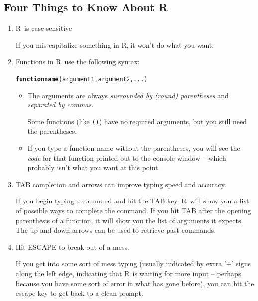 \documentclass[twoside]{book}\usepackage[]{graphicx}\usepackage[]{xcolor}
\makeatletter
\newcommand{\hlstd}[1]{\textcolor[rgb]{0.345,0.345,0.345}{#1}}%
\newcommand{\hlkwd}[1]{\textcolor[rgb]{0.737,0.353,0.396}{\textbf{#1}}}%
\newenvironment{kframe}{%
 \def\at@end@of@kframe{}%
 \ifinner\ifhmode%
  \def\at@end@of@kframe{\end{minipage}}%
  \begin{minipage}{\columnwidth}%
 \fi\fi%
 \def\FrameCommand##1{\hskip\@totalleftmargin \hskip-\fboxsep
 \colorbox{shadecolor}{##1}\hskip-\fboxsep
     \hskip-\linewidth \hskip-\@totalleftmargin \hskip\columnwidth}%
 \MakeFramed {\advance\hsize-\width
   \@totalleftmargin\z@ \linewidth\hsize
   \@setminipage}}%
 {\par\unskip\endMakeFramed%
 \at@end@of@kframe}
\newenvironment{knitrout}{}{} %
\newcommand{\Rindex}[1]{\index{\texttt{#1}}}
\newcommand{\function}[1]{{\color{purple!75!blue}\texttt{\StrSubstitute{#1}{()}{}()}}\Rindex{#1}}
\def\R{{\sf R}}
\makeatother
\begin{document}
\subsection{Four Things to Know About \R}
\begin{enumerate}
\item \R\ is case-sensitive

If you mis-capitalize something in \R, it won't do what you want.

\item 
Functions in \R\ use the following syntax:
\begin{knitrout}
\color{fgcolor}\begin{kframe}
\begin{alltt}
\hlkwd{functionname}\hlstd{( argument1, argument2, ... )}
\end{alltt}
\end{kframe}
\end{knitrout}
\vspace{-5mm}
\begin{itemize}
\item The arguments are \underline{always} \emph{surrounded by (round) parentheses} and 
\emph{separated by commas}.

Some functions (like \function{data()}) 
have no required arguments, but you still need the parentheses.

\item
If you type a function name without the parentheses, you will see the \emph{code} for that
function printed out to the console window -- which probably isn't what you want at this point.
\end{itemize}
\item
TAB completion and arrows can improve typing speed and accuracy.

If you begin typing a command and hit the TAB key, \R\ will show you a list of
possible ways to complete the command.  If you hit TAB after the opening
parenthesis of a function, it will show you the list of arguments it expects.
The up and down arrows can be used to retrieve past commands.
\item Hit ESCAPE to break out of a mess.
	
	If you get into some sort of mess typing (usually indicated by extra '$+$' 
	signs along the left edge, indicating that \R\ is waiting for more 
	input -- perhaps because you have some sort of error in what has gone before), 
	you can hit the escape key to get back to a clean prompt.
\end{enumerate}
\end{document}
